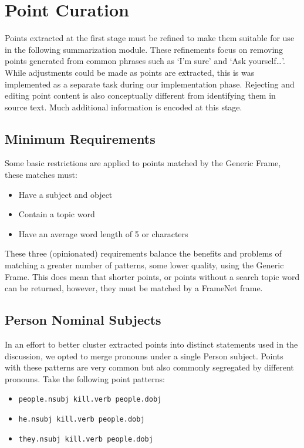 \chapter{Point Curation\label{chap:point-curation}}
  Points extracted at the first stage must be refined to make them suitable for use in the following summarization module. These refinements focus on removing points generated from common phrases such as `I'm sure' and `Ask yourself\dots'. While adjustments could be made as points are extracted, this is was implemented as a separate task during our implementation phase. Rejecting and editing point content is also conceptually different from identifying them in source text. Much additional information is encoded at this stage.

  \section{Minimum Requirements}
    Some basic restrictions are applied to points matched by the Generic Frame, these matches must:

    \begin{itemize}
      \item{Have a subject and object}
      \item{Contain a topic word}
      \item{Have an average word length of 5 or characters}
    \end{itemize}

    These three (opinionated) requirements balance the benefits and problems of matching a greater number of patterns, some lower quality, using the Generic Frame. This does mean that shorter points, or points without a search topic word can be returned, however, they must be matched by a FrameNet frame.

  \section{Person Nominal Subjects}
    In an effort to better cluster extracted points into distinct statements used in the discussion, we opted to merge pronouns under a single Person subject. Points with these patterns are very common but also commonly segregated by different pronouns. Take the following point patterns:
    \begin{itemize}
      \item{\texttt{people.nsubj kill.verb people.dobj}}
      \item{\texttt{he.nsubj kill.verb people.dobj}}
      \item{\texttt{they.nsubj kill.verb people.dobj}}
    \end{itemize}

